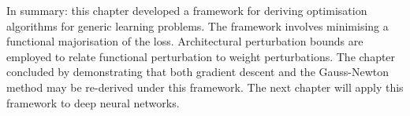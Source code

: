 \begin{refsection}
In summary: this chapter developed a framework for deriving optimisation algorithms for generic learning problems. The framework involves minimising a functional majorisation of the loss. Architectural perturbation bounds are employed to relate functional perturbation to weight perturbations. The chapter concluded by demonstrating that both gradient descent and the Gauss-Newton method may be re-derived under this framework. The next chapter will apply this framework to deep neural networks.

\printbibliography[heading=subbibliography]
\end{refsection}